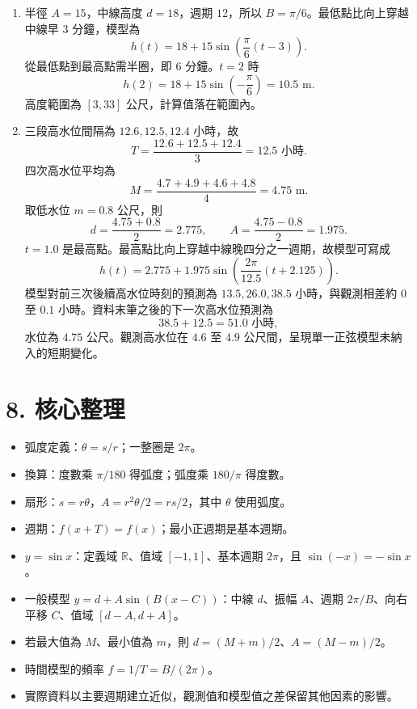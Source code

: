 \documentclass[11pt,a4paper]{article}
\providecommand{\tightlist}{%
  \setlength{\itemsep}{0pt}\setlength{\parskip}{0pt}}
\begin{document}
\begin{enumerate}
\[  =\frac{85\pi}{3}+28\text{ cm}.\]
\item
  半徑 \(A=15\)，中線高度 \(d=18\)，週期 \(12\)，所以 \(B=\pi/6\)。最低點比向上穿越中線早 \(3\) 分鐘，模型為
  \[h(t)=18+15\sin\left(\frac\pi6(t-3)\right).\]
  從最低點到最高點需半圈，即 \(6\) 分鐘。\(t=2\) 時
  \[h(2)=18+15\sin\left(-\frac\pi6\right)=10.5\text{ m}.\]
  高度範圍為 \([3,33]\) 公尺，計算值落在範圍內。
\item
  三段高水位間隔為 \(12.6,12.5,12.4\) 小時，故
  \[T=\frac{12.6+12.5+12.4}{3}=12.5\text{ 小時}.\]
  四次高水位平均為
  \[M=\frac{4.7+4.9+4.6+4.8}{4}=4.75\text{ m}.\]
  取低水位 \(m=0.8\) 公尺，則
  \[d=\frac{4.75+0.8}{2}=2.775,\qquad
  A=\frac{4.75-0.8}{2}=1.975.\]
  \(t=1.0\) 是最高點。最高點比向上穿越中線晚四分之一週期，故模型可寫成
  \[h(t)=2.775+1.975\sin\left(\frac{2\pi}{12.5}(t+2.125)\right).\]
  模型對前三次後續高水位時刻的預測為 \(13.5,26.0,38.5\) 小時，與觀測相差約 \(0\) 至 \(0.1\) 小時。資料末筆之後的下一次高水位預測為
  \[38.5+12.5=51.0\text{ 小時},\]
  水位為 \(4.75\) 公尺。觀測高水位在 \(4.6\) 至 \(4.9\) 公尺間，呈現單一正弦模型未納入的短期變化。
\end{enumerate}

\section{8. 核心整理}\label{ux6838ux5fc3ux6574ux7406}

\begin{itemize}
\tightlist
\item
  弧度定義：\(\theta=s/r\)；一整圈是 \(2\pi\)。
\item
  換算：度數乘 \(\pi/180\) 得弧度；弧度乘 \(180/\pi\) 得度數。
\item
  扇形：\(s=r\theta\)，\(A=r^2\theta/2=rs/2\)，其中 \(\theta\) 使用弧度。
\item
  週期：\(f(x+T)=f(x)\)；最小正週期是基本週期。
\item
  \(y=\sin x\)：定義域 \(\mathbb R\)、值域 \([-1,1]\)、基本週期 \(2\pi\)，且 \(\sin(-x)=-\sin x\)。
\item
  一般模型 \(y=d+A\sin(B(x-C))\)：中線 \(d\)、振幅 \(A\)、週期 \(2\pi/B\)、向右平移 \(C\)、值域 \([d-A,d+A]\)。
\item
  若最大值為 \(M\)、最小值為 \(m\)，則 \(d=(M+m)/2\)、\(A=(M-m)/2\)。
\item
  時間模型的頻率 \(f=1/T=B/(2\pi)\)。
\item
  實際資料以主要週期建立近似，觀測值和模型值之差保留其他因素的影響。
\end{itemize}
\end{document}
